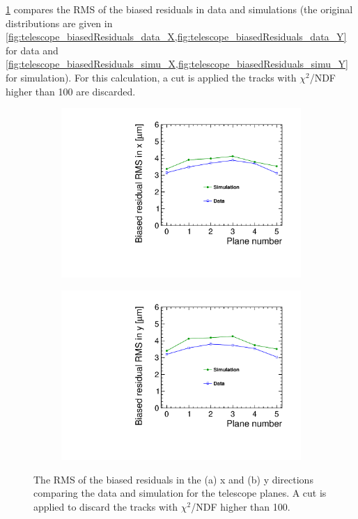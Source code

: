 \cref{fig:telescopeBiasedRMS_data_simu} compares the RMS of the biased
residuals in data and simulations (the original distributions are
given in
\cref{fig:telescope_biasedResiduals_data_X,fig:telescope_biasedResiduals_data_Y}
for data and
\cref{fig:telescope_biasedResiduals_simu_X,fig:telescope_biasedResiduals_simu_Y}
for simulation). For this calculation, a cut is applied the tracks
with $\chi^2$/NDF higher than 100 are discarded.

\begin{figure}[htbp] \centering
  \begin{subfigure}[b]{0.45\textwidth}
    \includegraphics[width=\textwidth]{figures/Telescope/biasedResiduals/RMSX_simu_vs_data.pdf}
    \caption{}
  \end{subfigure}\hfill
  \begin{subfigure}[b]{0.45\textwidth}
    \includegraphics[width=\textwidth]{figures/Telescope/biasedResiduals/RMSY_simu_vs_data.pdf}
    \caption{}
  \end{subfigure}
  \caption{The RMS of the biased residuals in the (a) x and (b) y
    directions comparing the data and simulation for the telescope
    planes. A cut is applied to discard the tracks with $\chi^2$/NDF
    higher than 100.}
  \label{fig:telescopeBiasedRMS_data_simu}
\end{figure}

